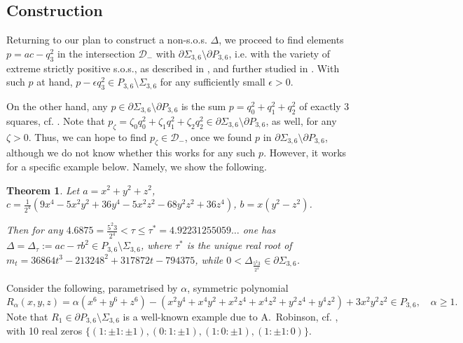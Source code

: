 \documentclass[a4paper,twoside,reqno]{amsart}
\newcommand{\CC}{\mathbb{C}}
\newcommand{\PHF}[2]{P_{{#2},{#1}}}
\newcommand{\SosHF}[2]{\Sigma_{{#2},{#1}}}
\newcommand{\PH}[2]{P_{{#1},{#2}}}
\newcommand{\SosH}[2]{\Sigma_{{#1},{#2}}}
\theoremstyle{plain}
\newtheorem{thm}[prop]{Theorem}
\theoremstyle{definition}
\theoremstyle{remark}
\begin{document}
\subsection{Construction}
Returning to our plan to construct a non-s.o.s. $\Delta$, we proceed to find elements $p=ac-q_3^2$ in the intersection $\mathcal{D}_-$ with $\partial\SosH{3}{6}\setminus\partial\PH{3}{6}$, i.e. with the variety of extreme strictly positive s.o.s.,
as described in  \cite{MR2904568}, and further studied in \cite{algbound}.
With such $p$ at hand, $p-\epsilon q_3^2\in \PH{3}{6}\setminus \SosH{3}{6}$
for 
any sufficiently small $\epsilon>0$. 

On the other hand, any $p\in\partial\SosH{3}{6}\setminus\partial\PH{3}{6}$ is the sum $p=q_0^2+q_1^2+q_2^2$ of exactly 3 squares,  %
cf. \cite{MR2904568}.
Note that $p_\zeta=\zeta_0q_0^2+\zeta_1q_1^2+\zeta_2q_2^2\in \partial\SosH{3}{6}\setminus\partial\PH{3}{6}$, as well, for any $\zeta>0$. 
Thus, we can hope to find $p_\zeta\in\mathcal{D}_-$, once we found $p$ in $\partial\SosH{3}{6}\setminus\partial\PH{3}{6}$, although we do not know whether this works for any such $p$.
However, it works for a specific example below. 
Namely, we show the following.
\begin{thm}\label{thm:exDelta}
Let $a=x^2+y^2+z^2$, 
$c=\frac{1}{2^4}\left(9x^4-5x^2y^2+36y^4-5x^2z^2-68y^2z^2+36z^4\right)$, $b=x(y^2-z^2)$.

Then
for any $4.6875=\frac{5^2 3}{2^4}<\tau\leq\tau^*=4.92231255059\dots$ one has $\Delta=\Delta_{\tau}:=ac-\tau b^2\in \PHF{6}{3}\setminus \SosHF{6}{3}$,
where $\tau^*$ is the unique real root of $m_t=36864t^3-213248^2+317872t-794375$,
while $0<\Delta_\frac{5^2 3}{2^4}\in \partial \SosH{3}{6}$.
\end{thm}


Consider the following, parametrised by $\alpha$, symmetric polynomial
\begin{equation}\label{eq:robinson}
  R_{\alpha}(x,y,z)=\alpha (x^6+y^6+z^6)-(x^2y^4+x^4y^2+x^2z^4+x^4z^2+y^2z^4+y^4z^2)+3x^2y^2z^2\in \PH{3}{6}, \quad \alpha\geq 1.
\end{equation}
Note that $R_1\in\partial\PH{3}{6}\setminus\SosH{3}{6}$ is a well-known example due to A.~Robinson,
cf. \cite{Rez-concr-h17}, with 10 real zeros $\{(1{:}\pm 1{:}\pm 1), (0{:}1{:}\pm 1), (1{:}0{:}\pm 1), (1{:}\pm 1{:}0)\}$.
\end{document}
